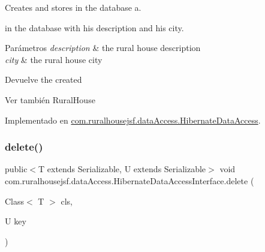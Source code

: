 Creates and stores in the database a. 


\begin{DoxyCode}{0}
\end{DoxyCode}
 in the database with his description and his city.


\begin{DoxyParams}{Parámetros}
{\em description} & the rural house description \\
\hline
{\em city} & the rural house city\\
\hline
\end{DoxyParams}
\begin{DoxyReturn}{Devuelve}
the created
\begin{DoxyCode}{0}
\end{DoxyCode}

\end{DoxyReturn}
\begin{DoxySeeAlso}{Ver también}
Rural\+House 
\end{DoxySeeAlso}


Implementado en \mbox{\hyperlink{classcom_1_1ruralhousejsf_1_1data_access_1_1_hibernate_data_access_a23eafc2c1f43052f2005a863d6592abc}{com.\+ruralhousejsf.\+data\+Access.\+Hibernate\+Data\+Access}}.

\mbox{\label{interfacecom_1_1ruralhousejsf_1_1data_access_1_1_hibernate_data_access_interface_a887957b637255d48878d157ee414027a}} 
\subsubsection{\texorpdfstring{delete()}{delete()}}
{\footnotesize\ttfamily public$<$T extends Serializable, U extends Serializable$>$ void com.\+ruralhousejsf.\+data\+Access.\+Hibernate\+Data\+Access\+Interface.\+delete (\begin{DoxyParamCaption}\item[{Class$<$ T $>$}]{cls,  }\item[{U}]{key }\end{DoxyParamCaption})}



